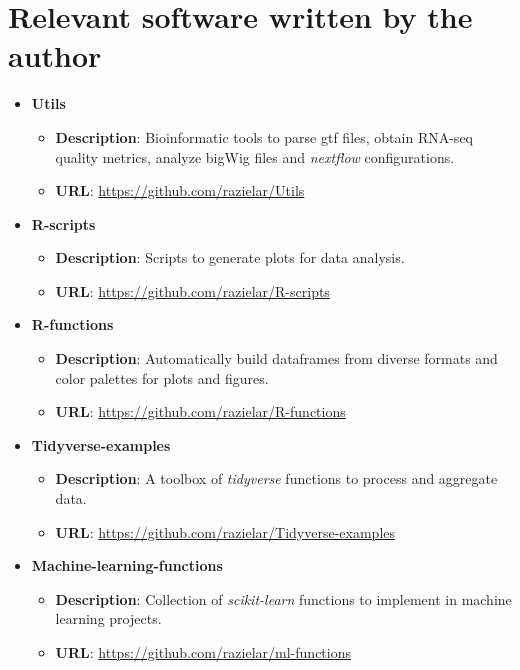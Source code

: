 \section{Relevant software written by the author}
\label{sec:extra_soft}

\begin{itemize}
\item \textbf{{\selectfont Utils}}
\begin{itemize}
\item \textbf{Description}: Bioinformatic tools to parse gtf files, obtain RNA-seq quality metrics, analyze bigWig files and \textit{nextflow}\autocite{paolo_nextflow} configurations.
\item \textbf{URL}: \url{https://github.com/razielar/Utils}
\end{itemize}

\item \textbf{{\selectfont R-scripts}}
\begin{itemize}
\item \textbf{Description}: Scripts to generate plots for data analysis.
\item \textbf{URL}: \url{https://github.com/razielar/R-scripts}
\end{itemize}

\item \textbf{{\selectfont R-functions}}
\begin{itemize}
\item \textbf{Description}: Automatically build dataframes from diverse formats and color palettes for plots and figures. 
\item \textbf{URL}: \url{https://github.com/razielar/R-functions}
\end{itemize}

\item \textbf{{\selectfont Tidyverse-examples}}
\begin{itemize}
\item \textbf{Description}: A toolbox of \textit{tidyverse} functions to process and aggregate data. 
\item \textbf{URL}: \url{https://github.com/razielar/Tidyverse-examples}
\end{itemize}

\item \textbf{{\selectfont Machine-learning-functions}}
\begin{itemize}
\item \textbf{Description}: Collection of \textit{scikit-learn}\autocite{pedregosa_2011_scikit} functions to implement in machine learning projects. 
\item \textbf{URL}: \url{https://github.com/razielar/ml-functions}
\end{itemize}

\end{itemize}

